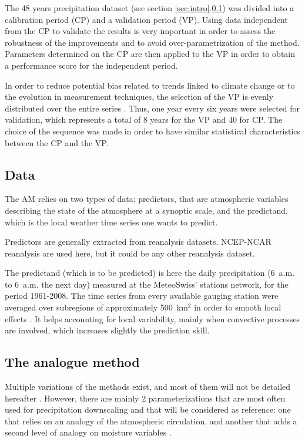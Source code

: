 \documentclass[review]{elsarticle}
\begin{document}
The 48 years precipitation dataset (see section \ref{sec:intro}.\ref{sec:data}) was divided into a calibration period (CP) and a validation period (VP). Using data independent from the CP to validate the results is very important in order to assess the robustness of the improvements and to avoid over-parametrization of the method. Parameters determined on the CP are then applied to the VP in order to obtain a performance score for the independent period.

In order to reduce potential bias related to trends linked to climate change or to the evolution in measurement techniques, the selection of the VP is evenly distributed over the entire series \citep{BenDaoud2010}. Thus, one year every six years were selected for validation, which represents a total of 8 years for the VP and 40 for CP. The choice of the sequence was made in order to have similar statistical characteristics between the CP and the VP.


\subsection{Data}
\label{sec:data}

The AM relies on two types of data: predictors, that are atmospheric variables describing the state of the atmosphere at a synoptic scale, and the predictand, which is the local weather time series one wants to predict.

Predictors are generally extracted from reanalysis datasets. NCEP-NCAR reanalysis \citep[6-hourly, 17 pressure levels at a resolution of 2.5\degree, see][]{Kalnay1996} are used here, but it could be any other reanalysis dataset.

The predictand (which is to be predicted) is here the daily precipitation (6~a.m. to 6~a.m. the next day) measured at the MeteoSwiss' stations network, for the period 1961-2008. The time series from every available gauging station were averaged over subregions of approximately 500~km$^{2}$ in order to smooth local effects \citep{Obled2002, Marty2012}. It helps accounting for local variability, mainly when convective processes are involved, which increases slightly the prediction skill.


\subsection{The analogue method}
\label{sec:references}

Multiple variations of the methods exist, and most of them will not be detailed hereafter \cite[see][for more comprehensive listings]{BenDaoud2016}. However, there are mainly 2 parameterizations that are most often used for precipitation downscaling and that will be considered as reference: one that relies on an analogy of the atmospheric circulation, and another that adds a second level of analogy on moisture variables \citep{Obled2002, Bontron2005, Marty2012}.
\end{document}
